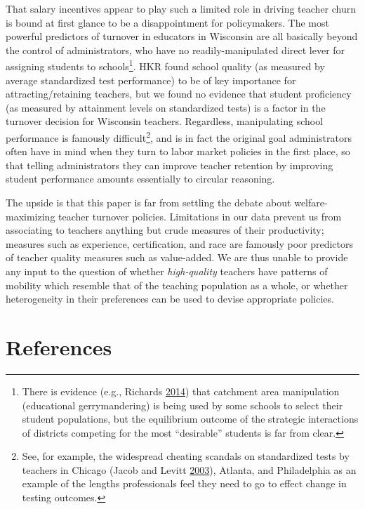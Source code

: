 \documentclass[12pt,]{article}
\let\rmarkdownfootnote\footnote%
\def\footnote{\protect\rmarkdownfootnote}
\newcommand{\TAG}[1]{}
\begin{document}
That salary incentives appear to play such a limited role in driving
teacher churn is bound at first glance to be a disappointment for
policymakers. The most powerful predictors of turnover in educators in
Wisconsin are all basically beyond the control of administrators, who
have no readily-manipulated direct lever for assigning students to
schools\footnote{There is evidence (e.g., Richards
  \protect\hyperlink{ref-richards}{2014}) that catchment area
  manipulation (educational gerrymandering) is being used by some
  schools to select their student populations, but the equilibrium
  outcome of the strategic interactions of districts competing for the
  most ``desirable'' students is far from clear.}. HKR found school
quality (as measured by average standardized test performance) to be of
key importance for attracting/retaining teachers, but we found no
evidence that student proficiency (as measured by attainment levels on
standardized tests) is a factor in the turnover decision for Wisconsin
teachers. Regardless, manipulating school performance is famously
difficult\footnote{See, for example, the widespread cheating scandals on
  standardized tests by teachers in Chicago (Jacob and Levitt
  \protect\hyperlink{ref-jacob}{2003}), Atlanta, and Philadelphia as an
  example of the lengths professionals feel they need to go to effect
  change in testing outcomes.}, and is in fact the original goal
administrators often have in mind when they turn to labor market
policies in the first place, so that telling administrators they can
improve teacher retention by improving student performance amounts
essentially to circular reasoning.

The upside is that this paper is far from settling the debate about
welfare-maximizing teacher turnover policies. Limitations in our data
prevent us from associating to teachers anything but crude measures of
their productivity; measures such as experience, certification, and race
are famously poor predictors of teacher quality measures such as
value-added. We are thus unable to provide any input to the question of
whether \emph{high-quality} teachers have patterns of mobility which
resemble that of the teaching population as a whole, or whether
heterogeneity in their preferences can be used to devise appropriate
policies.

\TAG{END_BODY}

\section*{References}\label{references}
\end{document}
